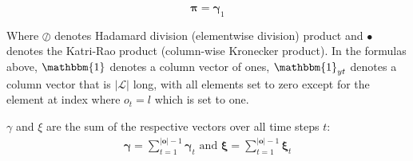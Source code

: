 \begin{equation}
\pmb{\pi}
    = \pmb{\gamma}_1
    \label{eq:initial-probabilities-update}
\end{equation}

Where $\oslash$ denotes Hadamard division (elementwise division) product and $\bullet$ denotes the Katri-Rao product (column-wise Kronecker product).
In the formulas above, $\mathbbm{1}$ denotes a column vector of ones, $\mathbbm{1}_{yt}$ denotes a column vector that is $|\mathcal{L}|$ long, with all elements set to zero except for the element at index where $o_t = l$ which is set to one.

$\gamma$ and $\xi$ are the sum of the respective vectors over all time steps $t$:
\begin{align}
    \pmb{\gamma} = \sum_{t=1}^{|\mathbf{o}|-1} \pmb{\gamma}_t 
    \text{ and } 
    \pmb{\xi} = \sum_{t=1}^{|\mathbf{o}|-1} \pmb{\xi}_t
\end{align} 

